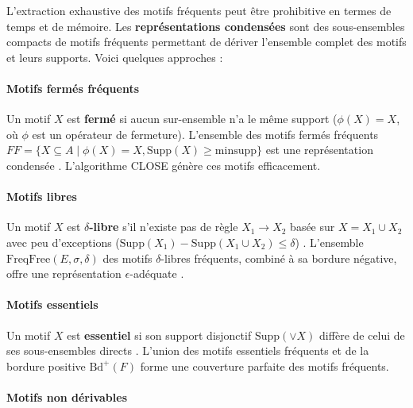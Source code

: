 \documentclass[a4paper,12pt]{article}
\begin{document}
        \label{sec:rep_condensees}
        
        L’extraction exhaustive des motifs fréquents peut être prohibitive en termes de temps et de mémoire. Les \textbf{représentations condensées} sont des sous-ensembles compacts de motifs fréquents permettant de dériver l’ensemble complet des motifs et leurs supports. Voici quelques approches :
        
        \paragraph{Motifs fermés fréquents}
        
        Un motif \( X \) est \textbf{fermé} si aucun sur-ensemble n’a le même support (\( \phi(X) = X \), où \( \phi \) est un opérateur de fermeture). L’ensemble des motifs fermés fréquents \( FF = \{X \subseteq A \mid \phi(X) = X, \text{Supp}(X) \geq \text{minsupp}\} \) est une représentation condensée \cite{PBTL99a}. L’algorithme CLOSE génère ces motifs efficacement.
        
        \paragraph{Motifs libres}
        
        Un motif \( X \) est \textbf{\( \delta \)-libre} s’il n’existe pas de règle \( X_1 \rightarrow X_2 \) basée sur \( X = X_1 \cup X_2 \) avec peu d’exceptions (\( \text{Supp}(X_1) - \text{Supp}(X_1 \cup X_2) \leq \delta \)) \cite{BB00}. L’ensemble \( \text{FreqFree}(E, \sigma, \delta) \) des motifs \( \delta \)-libres fréquents, combiné à sa bordure négative, offre une représentation \( \epsilon \)-adéquate \cite{BBR03}.
        
        \paragraph{Motifs essentiels}
        
        Un motif \( X \) est \textbf{essentiel} si son support disjonctif \( \text{Supp}(\vee X) \) diffère de celui de ses sous-ensembles directs \cite{CCL05}. L’union des motifs essentiels fréquents et de la bordure positive \( \text{Bd}^+(F) \) forme une couverture parfaite des motifs fréquents.
        
        \paragraph{Motifs non dérivables}
        
\end{document}
